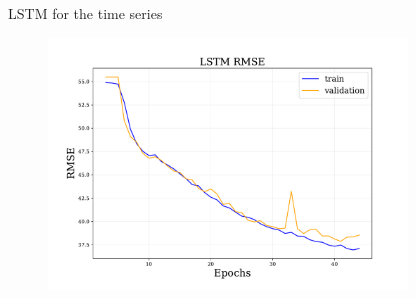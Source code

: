 \documentclass{beamer}
\begin{document}

    

\begin{frame}{LSTM for the time series}

    \begin{figure}
        \centering
        \includegraphics[width=0.85\textwidth]{figures/lstm_rmse.pdf}
    \end{figure}

\end{frame}


    
\end{document}
